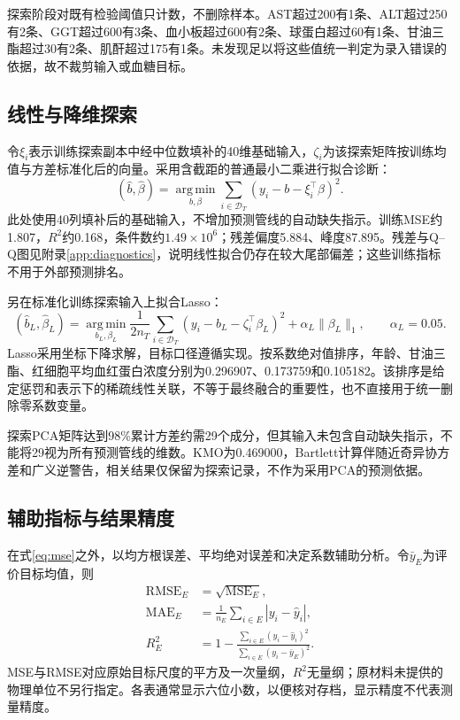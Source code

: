 探索阶段对既有检验阈值只计数，不删除样本。AST超过200有1条、ALT超过250有2条、GGT超过600有3条、血小板超过600有2条、球蛋白超过60有1条、甘油三酯超过30有2条、肌酐超过175有1条。未发现足以将这些值统一判定为录入错误的依据，故不裁剪输入或血糖目标。

\subsection{线性与降维探索}
令$\xi_i$表示训练探索副本中经中位数填补的40维基础输入，$\zeta_i$为该探索矩阵按训练均值与方差标准化后的向量。采用含截距的普通最小二乘进行拟合诊断：
\begin{equation}
(\widehat b,\widehat\beta)=\operatorname*{arg\,min}_{b,\beta}
\sum_{i\in\mathcal D_T}(y_i-b-\xi_i^\top\beta)^2.
\label{eq:ols}
\end{equation}
此处使用40列填补后的基础输入，不增加预测管线的自动缺失指示。训练MSE约1.807，$R^2$约0.168，条件数约$1.49\times10^6$；残差偏度5.884、峰度87.895。残差与Q--Q图见附录\ref{app:diagnostics}，说明线性拟合仍存在较大尾部偏差；这些训练指标不用于外部预测排名。

另在标准化训练探索输入上拟合Lasso：
\begin{equation}
(\widehat b_L,\widehat\beta_L)=\operatorname*{arg\,min}_{b_L,\beta_L}
\frac{1}{2n_T}\sum_{i\in\mathcal D_T}(y_i-b_L-\zeta_i^\top\beta_L)^2
+\alpha_L\|\beta_L\|_1,\qquad\alpha_L=0.05.
\label{eq:lasso}
\end{equation}
Lasso采用坐标下降求解，目标口径遵循实现\cite{lasso}。按系数绝对值排序，年龄、甘油三酯、红细胞平均血红蛋白浓度分别为0.296907、0.173759和0.105182。该排序是给定惩罚和表示下的稀疏线性关联，不等于最终融合的重要性，也不直接用于统一删除零系数变量。

探索PCA矩阵达到98\%累计方差约需29个成分，但其输入未包含自动缺失指示，不能将29视为所有预测管线的维数。KMO为0.469000，Bartlett计算伴随近奇异协方差和广义逆警告，相关结果仅保留为探索记录，不作为采用PCA的预测依据。

\subsection{辅助指标与结果精度}
在式\eqref{eq:mse}之外，以均方根误差、平均绝对误差和决定系数辅助分析。令$\bar y_E$为评价目标均值，则
\begin{equation}
\begin{aligned}
\operatorname{RMSE}_E&=\sqrt{\operatorname{MSE}_E},\\
\operatorname{MAE}_E&=\frac1{n_E}\sum_{i\in E}|y_i-\hat y_i|,\\
R_E^2&=1-\frac{\sum_{i\in E}(y_i-\hat y_i)^2}{\sum_{i\in E}(y_i-\bar y_E)^2}.
\end{aligned}
\label{eq:auxiliary}
\end{equation}
MSE与RMSE对应原始目标尺度的平方及一次量纲，$R^2$无量纲；原材料未提供的物理单位不另行指定。各表通常显示六位小数，以便核对存档，显示精度不代表测量精度。
